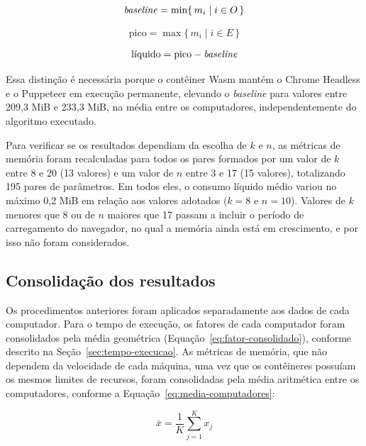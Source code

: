 \begin{equation}
\label{eq:baseline}
\text{\emph{baseline}} = \min \{\, m_i \mid i \in O \,\}
\end{equation}

\begin{equation}
\label{eq:pico}
\text{pico} = \max \{\, m_i \mid i \in E \,\}
\end{equation}

\begin{equation}
\label{eq:liquido}
\text{líquido} = \text{pico} - \text{\emph{baseline}}
\end{equation}

Essa distinção é necessária porque o contêiner Wasm mantém o Chrome Headless e o Puppeteer em execução permanente, elevando o \emph{baseline} para valores entre 209,3 MiB e 233,3 MiB, na média entre os computadores, independentemente do algoritmo executado.

Para verificar se os resultados dependiam da escolha de $k$ e $n$, as métricas de memória foram recalculadas para todos os pares formados por um valor de $k$ entre 8 e 20 (13 valores) e um valor de $n$ entre 3 e 17 (15 valores), totalizando 195 pares de parâmetros. Em todos eles, o consumo líquido médio variou no máximo 0,2 MiB em relação aos valores adotados ($k = 8$ e $n = 10$). Valores de $k$ menores que 8 ou de $n$ maiores que 17 passam a incluir o período de carregamento do navegador, no qual a memória ainda está em crescimento, e por isso não foram considerados.

\subsection{Consolidação dos resultados}
\label{sec:consolidacao}

Os procedimentos anteriores foram aplicados separadamente aos dados de cada computador. Para o tempo de execução, os fatores de cada computador foram consolidados pela média geométrica (Equação~\eqref{eq:fator-consolidado}), conforme descrito na Seção~\ref{sec:tempo-execucao}. As métricas de memória, que não dependem da velocidade de cada máquina, uma vez que os contêineres possuíam os mesmos limites de recursos, foram consolidadas pela média aritmética entre os computadores, conforme a Equação~\eqref{eq:media-computadores}:

\begin{equation}
\label{eq:media-computadores}
\bar{x} = \frac{1}{K} \sum_{j=1}^{K} x_j
\end{equation}

